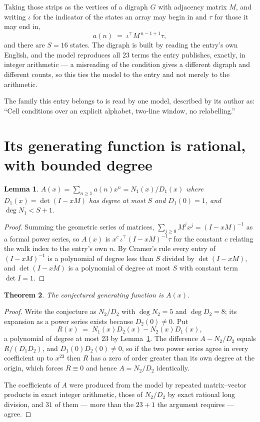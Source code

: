 \documentclass[11pt,a4paper]{article}
\theoremstyle{plain}
\newtheorem{theorem}{Theorem}
\newtheorem{lemma}[theorem]{Lemma}
\theoremstyle{definition}
\begin{document}
Taking those strips as the vertices of a digraph $G$ with adjacency matrix $M$, and writing
$\iota$ for the indicator of the states an array may begin in and $\tau$ for those it may end
in,
\[
a(n)\;=\;\iota^{\!\top}M^{\,n-1+1}\tau ,
\]
and there are $S=16$ states. The digraph is built by reading the entry's own English, and the
model reproduces all $23$ terms the entry publishes, exactly, in integer arithmetic --- a
misreading of the condition gives a different digraph and different counts, so this ties the
model to the entry and not merely to the arithmetic.

The family this entry belongs to is read by one model, described by its author as: ``Cell conditions over an explicit alphabet, two-line window, no relabelling.''


\section{Its generating function is rational, with bounded degree}

\begin{lemma}\label{lem:rat}
$A(x)=\sum_{n\ge1}a(n)x^n=N_1(x)/D_1(x)$ where $D_1(x)=\det(I-xM)$ has degree at most
$S$ and $D_1(0)=1$, and $\deg N_1<S+1$.
\end{lemma}

\begin{proof}
Summing the geometric series of matrices, $\sum_{j\ge0}M^jx^j=(I-xM)^{-1}$ as a formal
power series, so $A(x)$ is $x^{c}\,\iota^{\!\top}(I-xM)^{-1}\tau$ for the constant $c$
relating the walk index to the entry's own $n$. By Cramer's rule every entry of
$(I-xM)^{-1}$ is a polynomial of degree less than $S$ divided by $\det(I-xM)$, and
$\det(I-xM)$ is a polynomial of degree at most $S$ with constant term $\det I=1$.
\end{proof}

\begin{theorem}
The conjectured generating function is $A(x)$.
\end{theorem}

\begin{proof}
Write the conjecture as $N_2/D_2$ with $\deg N_2=5$ and $\deg D_2=8$; its expansion as a
power series exists because $D_2(0)\neq0$. Put
\[
R(x)\;=\;N_1(x)D_2(x)-N_2(x)D_1(x),
\]
a polynomial of degree at most $23$ by Lemma~\ref{lem:rat}. The difference
$A-N_2/D_2$ equals $R/(D_1D_2)$, and $D_1(0)D_2(0)\neq0$, so if the two power series agree in
every coefficient up to $x^{23}$ then $R$ has a zero of order greater than its own
degree at the origin, which forces $R\equiv0$ and hence $A=N_2/D_2$ identically.

The coefficients of $A$ were produced from the model by repeated matrix--vector products in
exact integer arithmetic, those of $N_2/D_2$ by exact rational long division, and $31$
of them --- more than the $23+1$ the argument requires --- agree.
\end{proof}
\end{document}
